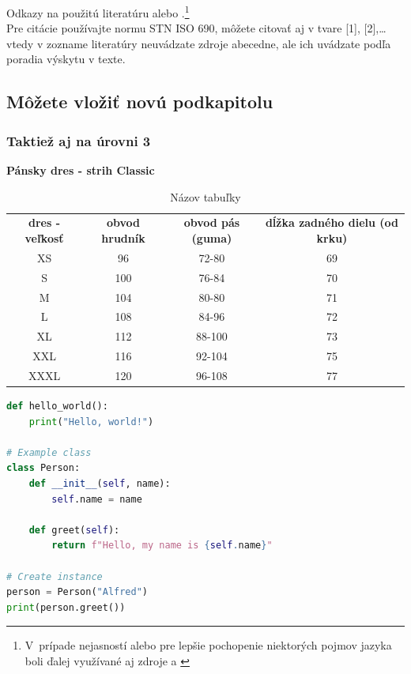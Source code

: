 \newpage
\noindent
Odkazy na použitú literatúru \parencite{luptak2016thesis} alebo \textcite{borgman2003from}.\footnote{V prípade nejasností alebo pre lepšie pochopenie niektorých pojmov jazyka boli ďalej využívané aj zdroje \parencite{lynch2005where} a \parencite{luptak2016thesis}}
\\Pre citácie používajte normu STN ISO 690, môžete citovať aj v tvare [1], [2],… vtedy v zozname literatúry neuvádzate zdroje abecedne, ale ich uvádzate podľa poradia výskytu v texte. 

\subsection{Môžete vložiť novú podkapitolu}
\subsubsection{Taktiež aj na úrovni 3}

\begin{table}[!h]
    \centering
    \caption{Názov tabuľky}
    {\color{red} \textbf{Pánsky dres - strih Classic}}\\
    \vspace{1em}
    \begin{tabular}{cccc}  
        \textbf{dres - veľkosť} & \textbf{obvod hrudník} & \textbf{obvod pás (guma)} & \textbf{dĺžka zadného dielu (od krku)} \\
        XS & 96 & 72-80 & 69 \\
        S & 100 & 76-84 & 70 \\
        M & 104 & 80-80 & 71 \\
        L & 108 & 84-96 & 72 \\
        XL & 112 & 88-100 & 73 \\
        XXL & 116 & 92-104 & 75 \\
        XXXL & 120 & 96-108 & 77 \\
    \end{tabular}
    \label{tab:example}
\end{table}

\begin{lstlisting}[language=Python, caption={Príklad kódu v Pythone}, label={lst:python-example}]    
def hello_world():
    print("Hello, world!")
        
# Example class
class Person:
    def __init__(self, name):
        self.name = name
    
    def greet(self):
        return f"Hello, my name is {self.name}"

# Create instance
person = Person("Alfred")
print(person.greet())
\end{lstlisting}